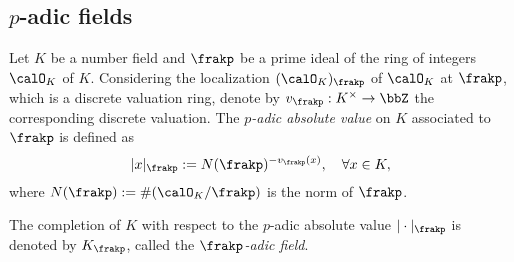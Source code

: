 




\subsection[p-adic fields]{\(p\)-adic fields}

    
    \begin{construction}\label{constr:p-adic_absolute_value_on_number_field}
        Let \(K\) be a number field and \(\frakp\) be a prime ideal of the ring of integers \(\calO_K\) of \(K\).
        Considering the localization \((\calO_K)_\frakp\) of \(\calO_K\) at \(\frakp\), which is a discrete valuation ring, denote by \(v_\frakp: K^\times \to \bbZ\) the corresponding discrete valuation.
        The \emph{\(p\)-adic absolute value} on \(K\) associated to \(\frakp\) is defined as
        \[ |x|_\frakp := N(\frakp)^{-v_\frakp(x)},\quad\forall x \in K, \]
        where \(N(\frakp) := \#(\calO_K / \frakp)\) is the norm of \(\frakp\).

        The completion of \(K\) with respect to the \(p\)-adic absolute value \(|\cdot|_\frakp\) is denoted by \(K_\frakp\), called the \emph{\(\frakp\)-adic field}.
    \end{construction}

